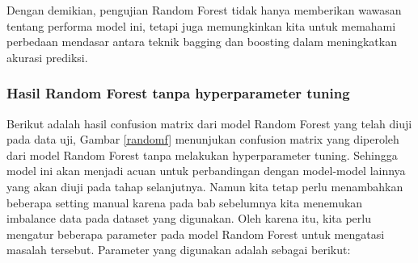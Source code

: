 Dengan demikian, pengujian Random Forest tidak hanya memberikan wawasan tentang performa model ini, tetapi juga memungkinkan kita untuk memahami perbedaan mendasar antara teknik bagging dan boosting dalam meningkatkan akurasi prediksi.

\subsubsection{Hasil Random Forest tanpa hyperparameter tuning}

Berikut adalah hasil confusion matrix dari model Random Forest yang telah diuji pada data uji, Gambar \ref{randomf} menunjukan confusion matrix yang diperoleh dari model Random Forest tanpa melakukan hyperparameter tuning. Sehingga model ini akan menjadi acuan untuk perbandingan dengan model-model lainnya yang akan diuji pada tahap selanjutnya. Namun kita tetap perlu menambahkan beberapa setting manual karena pada bab sebelumnya kita menemukan imbalance data pada dataset yang digunakan. Oleh karena itu, kita perlu mengatur beberapa parameter pada model Random Forest untuk mengatasi masalah tersebut. Parameter yang digunakan adalah sebagai berikut:








